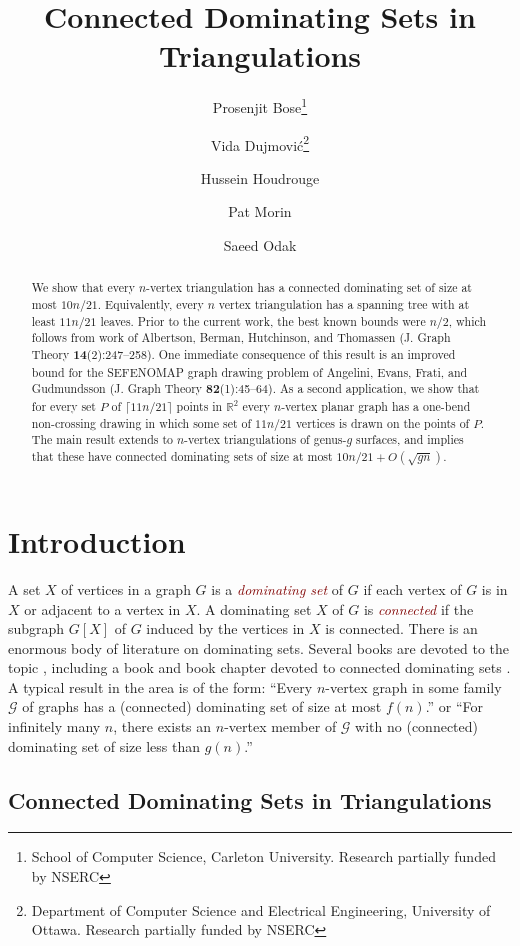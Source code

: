 \documentclass{article}
\title{Connected Dominating Sets in Triangulations}
\author{%
  Prosenjit Bose\thanks{School of Computer Science, Carleton University. Research partially funded by NSERC} \and
  Vida Dujmović\thanks{Department of Computer Science and Electrical Engineering, University of Ottawa. Research partially funded by NSERC}\and
  Hussein Houdrouge\footnotemark[1] \and
  Pat Morin\footnotemark[1] \and
  Saeed Odak\footnotemark[2]}
\date{}
\newcommand{\R}{\mathbb{R}}
\newcommand{\defin}[1]{\emph{\textcolor{Maroon}{#1}}}
\theoremstyle{definition}
\begin{document}
\maketitle

\begin{abstract}
  We show that every $n$-vertex triangulation has a connected dominating set of size at most $10n/21$.  Equivalently, every $n$ vertex triangulation has a spanning tree with at least $11n/21$ leaves. Prior to the current work, the best known bounds were $n/2$, which follows from work of Albertson, Berman, Hutchinson, and Thomassen (J. Graph Theory \textbf{14}(2):247--258). One immediate consequence of this result is an improved bound for the SEFENOMAP graph drawing problem of Angelini, Evans, Frati, and Gudmundsson (J. Graph Theory \textbf{82}(1):45--64).  As a second application, we show that for every set $P$ of $\lceil 11n/21\rceil$ points in $\R^2$ every $n$-vertex planar graph has a one-bend non-crossing drawing in which some set of  $11n/21$ vertices is drawn on the points of $P$.  The main result extends to $n$-vertex triangulations of genus-$g$ surfaces, and implies that these have connected dominating sets of size at most $10n/21+O(\sqrt{gn})$.
\end{abstract}


\section{Introduction}

A set $X$ of vertices in a graph $G$ is a \defin{dominating set} of $G$ if each vertex of $G$ is in $X$ or adjacent to a vertex in $X$.  A dominating set $X$ of $G$ is \defin{connected} if the subgraph $G[X]$ of $G$ induced by the vertices in $X$ is connected.  There is an enormous body of literature on dominating sets. Several books are devoted to the topic \cite{haynes.hedetniemi.ea:domination,haynes.hedetniemi.ea:topics,du.wan:connected,haynes.hedetniemi.ea:vol2}, including a book and book chapter devoted to connected dominating sets \cite{du.wan:connected,chellali.favaron:connected}.  A typical result in the area is of the form: ``Every $n$-vertex graph in some family $\mathcal{G}$ of graphs has a (connected) dominating set of size at most $f(n)$.'' or ``For infinitely many $n$, there exists an $n$-vertex member of $\mathcal{G}$ with no (connected) dominating set of size less than $g(n)$.''

\subsection{Connected Dominating Sets in Triangulations}
\end{document}
